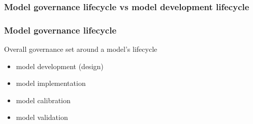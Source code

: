 \documentclass[11pt]{beamer}
\begin{document}
\begin{frame}
\frametitle{Model governance lifecycle vs model development lifecycle}
\begin{figure}[h]
	\centering
	\qquad
\end{figure}
\end{frame}


\begin{frame}
\frametitle{Model governance lifecycle}
Overall governance set around a model’s lifecycle
\begin{itemize}
\item model development (design)
\item model implementation
\item model calibration
\item model validation
\end{itemize} 
\end{frame}
\end{document}
